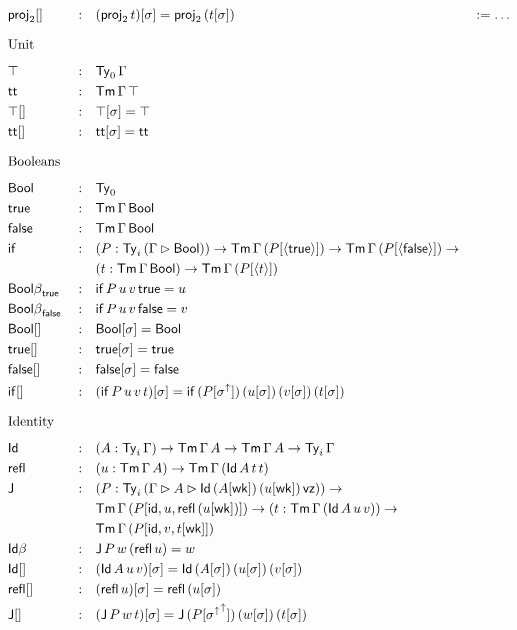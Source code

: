 \documentclass{article}
\begin{document}
\begin{alignat*}{5}
  & {\proj_2[]} && : && (\proj_2\,t)[\sigma] = \proj_2\,(t[\sigma]) && := \dots \\
  & \heading{Unit} \\
  & \top && : && \Ty_0\,\Gamma \\
  & \tt && : && \Tm\,\Gamma\,\top \\
  & {\top[]} && : && \top[\sigma] = \top \\
  & {\tt[]} && : && \tt[\sigma] = \tt \\
  & \heading{Booleans} \\
  & \Bool && : && \Ty_0 \\
  & \true && : && \Tm\,\Gamma\,\Bool \\
  & \false && : && \Tm\,\Gamma\,\Bool \\
  & \IF && : && (P:\Ty_i\,(\Gamma\rhd\Bool))\ra\Tm\,\Gamma\,(P[\lb\true\rb])\ra\Tm\,\Gamma\,(P[\lb\false\rb])\ra \\
  & && && (t:\Tm\,\Gamma\,\Bool)\ra\Tm\,\Gamma\,(P[\lb t\rb]) \\
  & {\Bool\beta}_\true && : && \IF\,P\,u\,v\,\true = u \\
  & {\Bool\beta}_\false && : && \IF\,P\,u\,v\,\false = v \\
  & {\Bool[]} && : && \Bool[\sigma] = \Bool \\
  & {\true[]} && : && \true[\sigma] = \true \\
  & {\false[]} && : && \false[\sigma] = \false \\
  & {\IF[]} && : && (\IF\,P\,u\,v\,t)[\sigma] = \IF\,(P[\sigma^\uparrow])\,(u[\sigma])\,(v[\sigma])\,(t[\sigma]) \\
  & \heading{Identity} \\
  & \Id && : && (A:\Ty_i\,\Gamma)\ra\Tm\,\Gamma\,A\ra\Tm\,\Gamma\,A\ra\Ty_i\,\Gamma \\
  & \refl && : && (u : \Tm\,\Gamma\,A) \ra \Tm\,\Gamma\,(\Id\,A\,t\,t) \\
  & \J && : && (P : \Ty_i\,(\Gamma\rhd A\rhd \Id\,(A[\wk])\,(u[\wk])\,\vz))\ra \\
  & && && \Tm\,\Gamma\,(P[\id,u,\refl\,(u[\wk])])\ra(t:\Tm\,\Gamma\,(\Id\,A\,u\,v))\ra \\
  & && && \Tm\,\Gamma\,(P[\id,v,t[\wk]]) \\
  & {\Id\beta} && : && \J\,P\,w\,(\refl\,u) = w \\
  & {\Id[]} && : && (\Id\,A\,u\,v)[\sigma] = \Id\,(A[\sigma])\,(u[\sigma])\,(v[\sigma]) \\
  & {\refl[]} && : && (\refl\,u)[\sigma] = \refl\,(u[\sigma]) \\
  & {\J[]} && : && (\J\,P\,w\,t)[\sigma] = \J\,(P[{\sigma^\uparrow}^\uparrow])\,(w[\sigma])\,(t[\sigma]) \\
\end{alignat*}
\end{document}

